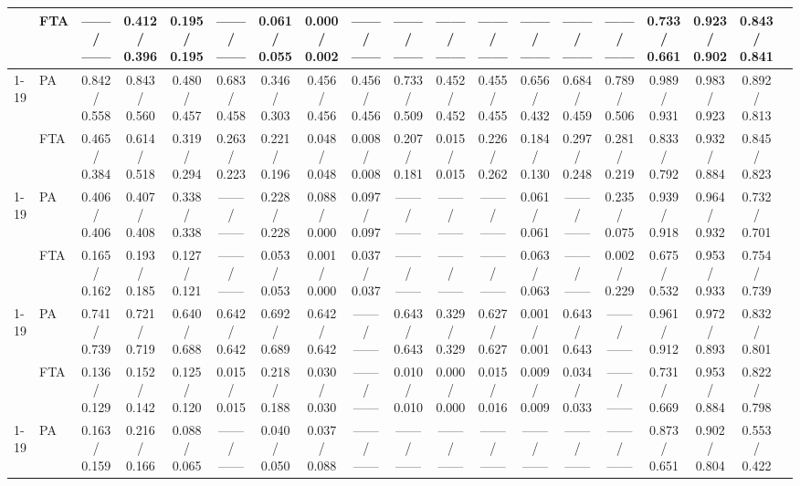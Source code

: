 \begin{table}[t]
{\begin{tabular}{llccccccccccccccccc}
     & FTA & ------ / ------ & 0.412 / 0.396 & 0.195 / 0.195 & ------ / ------ & 0.061 / 0.055 & 0.000 / 0.002 & ------ / ------ & ------ / ------ & ------ / ------ & ------ / ------ & ------ / ------ & ------ / ------ & ------ / ------ & 0.733 / 0.661 & 0.923 / 0.902 & 0.843 / 0.841 & \\
    \cline{1-19}
    \multirow{2}{*}{Zookeeper} & PA & 0.842 / 0.558 & 0.843 / 0.560 & 0.480 / 0.457 & 0.683 / 0.458 & 0.346 / 0.303 & 0.456 / 0.456 & 0.456 / 0.456 & 0.733 / 0.509 & 0.452 / 0.452 & 0.455 / 0.455 & 0.656 / 0.432 & 0.684 / 0.459 & 0.789 / 0.506 & 0.989 / 0.931 & 0.983 / 0.923 & 0.892 / 0.813 & \\
     & FTA & 0.465 / 0.384 & 0.614 / 0.518 & 0.319 / 0.294 & 0.263 / 0.223 & 0.221 / 0.196 & 0.048 / 0.048 & 0.008 / 0.008 & 0.207 / 0.181 & 0.015 / 0.015 & 0.226 / 0.262 & 0.184 / 0.130 & 0.297 / 0.248 & 0.281 / 0.219 & 0.833 / 0.792 & 0.932 / 0.884 & 0.845 / 0.823 & \\
    \cline{1-19}
    \multirow{2}{*}{BGL} & PA & 0.406 / 0.406 & 0.407 / 0.408 & 0.338 / 0.338 & ------ / ------ & 0.228 / 0.228 & 0.088 / 0.000 & 0.097 / 0.097 & ------ / ------ & ------ / ------ & ------ / ------ & 0.061 / 0.061 & ------ / ------ & 0.235 / 0.075 & 0.939 / 0.918 & 0.964 / 0.932 & 0.732 / 0.701 & \\
     & FTA & 0.165 / 0.162 & 0.193 / 0.185 & 0.127 / 0.121 & ------ / ------ & 0.053 / 0.053 & 0.001 / 0.000 & 0.037 / 0.037 & ------ / ------ & ------ / ------ & ------ / ------ & 0.063 / 0.063 & ------ / ------ & 0.002 / 0.229 & 0.675 / 0.532 & 0.953 / 0.933 & 0.754 / 0.739 & \\
    \cline{1-19}
    \multirow{2}{*}{HPC} & PA & 0.741 / 0.739 & 0.721 / 0.719 & 0.640 / 0.688 & 0.642 / 0.642 & 0.692 / 0.689 & 0.642 / 0.642 & ------ / ------ & 0.643 / 0.643 & 0.329 / 0.329 & 0.627 / 0.627 & 0.001 / 0.001 & 0.643 / 0.643 & ------ / ------ & 0.961 / 0.912 & 0.972 / 0.893 & 0.832 / 0.801 & \\
     & FTA & 0.136 / 0.129 & 0.152 / 0.142 & 0.125 / 0.120 & 0.015 / 0.015 & 0.218 / 0.188 & 0.030 / 0.030 & ------ / ------ & 0.010 / 0.010 & 0.000 / 0.000 & 0.015 / 0.016 & 0.009 / 0.009 & 0.034 / 0.033 & ------ / ------ & 0.731 / 0.669 & 0.953 / 0.884 & 0.822 / 0.798 & \\
    \cline{1-19}
    \multirow{2}{*}{Thunderbird} & PA & 0.163 / 0.159 & 0.216 / 0.166 & 0.088 / 0.065 & ------ / ------ & 0.040 / 0.050 & 0.037 / 0.088 & ------ / ------ & ------ / ------ & ------ / ------ & ------ / ------ & ------ / ------ & ------ / ------ & ------ / ------ & 0.873 / 0.651 & 0.902 / 0.804 & 0.553 / 0.422 & \\

\end{tabular}}
\end{table}
